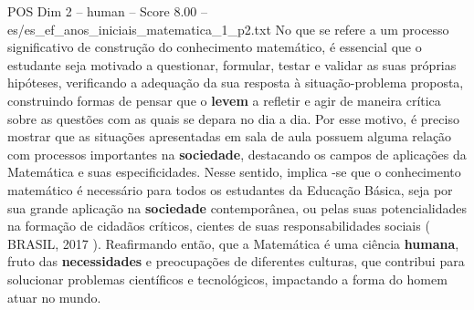 \begin{textsample}{POS Dim 2 – human – Score 8.00 – es/es\_ef\_anos\_iniciais\_matematica\_1\_p2.txt}  \label{ex:f2_pos_003}
No que se refere a um processo significativo de construção do conhecimento matemático, é essencial que o estudante seja motivado a questionar, formular, testar e validar as suas próprias hipóteses, verificando a adequação da sua resposta à situação-problema proposta, construindo formas de pensar que o \textbf{levem} a refletir e agir de maneira crítica sobre as questões com as quais se depara no dia a dia.
Por esse motivo, é preciso mostrar que as situações apresentadas em sala de aula possuem alguma relação com processos importantes na \textbf{sociedade}, destacando os campos de aplicações da Matemática e suas especificidades.
Nesse sentido, implica -se que o conhecimento matemático é necessário para todos os estudantes da Educação Básica, seja por sua grande aplicação na \textbf{sociedade} contemporânea, ou pelas suas potencialidades na formação de cidadãos críticos, cientes de suas responsabilidades sociais ( BRASIL, 2017 ).
Reafirmando então, que a Matemática é uma ciência \textbf{humana}, fruto das \textbf{necessidades} e preocupações de diferentes culturas, que contribui para solucionar problemas científicos e tecnológicos, impactando a forma do homem atuar no mundo.

\end{textsample}
